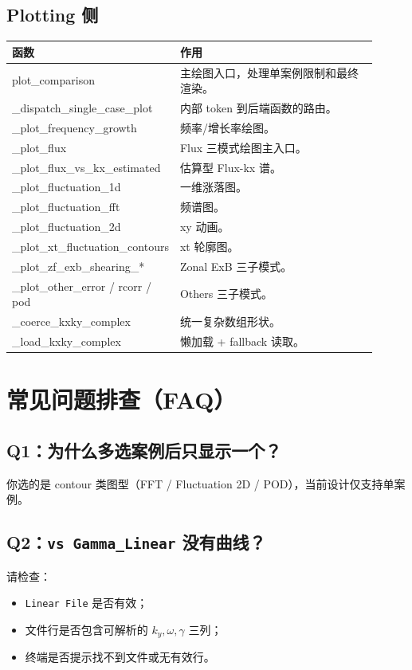 \documentclass[11pt,a4paper]{ctexart}
\begin{document}
\subsection{Plotting 侧}
\begin{longtable}{>{\ttfamily}p{0.33\linewidth} p{0.58\linewidth}}
\toprule
函数 & 作用 \\
\midrule
\endhead
plot\_comparison & 主绘图入口，处理单案例限制和最终渲染。 \\
\_dispatch\_single\_case\_plot & 内部 token 到后端函数的路由。 \\
\_plot\_frequency\_growth & 频率/增长率绘图。 \\
\_plot\_flux & Flux 三模式绘图主入口。 \\
\_plot\_flux\_vs\_kx\_estimated & 估算型 Flux-kx 谱。 \\
\_plot\_fluctuation\_1d & 一维涨落图。 \\
\_plot\_fluctuation\_fft & 频谱图。 \\
\_plot\_fluctuation\_2d & xy 动画。 \\
\_plot\_xt\_fluctuation\_contours & xt 轮廓图。 \\
\_plot\_zf\_exb\_shearing\_* & Zonal ExB 三子模式。 \\
\_plot\_other\_error / rcorr / pod & Others 三子模式。 \\
\_coerce\_kxky\_complex & 统一复杂数组形状。 \\
\_load\_kxky\_complex & 懒加载 + fallback 读取。 \\
\bottomrule
\end{longtable}

\section{常见问题排查（FAQ）}
\subsection*{Q1：为什么多选案例后只显示一个？}
你选的是 contour 类图型（FFT / Fluctuation 2D / POD），当前设计仅支持单案例。

\subsection*{Q2：\texttt{vs Gamma\_Linear} 没有曲线？}
请检查：
\begin{itemize}
  \item \texttt{Linear File} 是否有效；
  \item 文件行是否包含可解析的 \(k_y,\omega,\gamma\) 三列；
  \item 终端是否提示找不到文件或无有效行。
\end{itemize}
\end{document}
